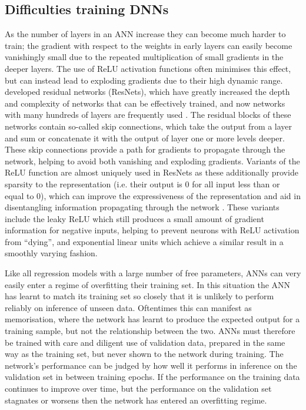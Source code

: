 \subsection{Difficulties training DNNs}

As the number of layers in an ANN increase they can become much harder to train; the gradient with respect to the weights in early layers can easily become vanishingly small due to the repeated multiplication of small gradients in the deeper layers.
The use of ReLU activation functions often minimises this effect, but can instead lead to exploding gradients due to their high dynamic range.
\citet{2015He} developed residual networks (ResNets), which have greatly increased the depth and complexity of networks that can be effectively trained, and now networks with many hundreds of layers are frequently used \citep[e.g.][]{Jegou2017}.
The residual blocks of these networks contain so-called skip connections, which take the output from a layer and sum or concatenate it with the output of layer one or more levels deeper.
These skip connections provide a path for gradients to propagate through the network, helping to avoid both vanishing and exploding gradients.
Variants of the ReLU function are almost uniquely used in ResNets as these additionally provide sparsity to the representation (i.e. their output is 0 for all input less than or equal to 0), which can improve the expressiveness of the representation and aid in disentangling information propagating through the network \citep{Glorot2011}.
These variants include the leaky ReLU \citep[$\max(0.01x, x)$;][]{Maas2013} which still produces a small amount of gradient information for negative inputs, helping to prevent neurons with ReLU activation from ``dying'', and exponential linear units \citep[ELUs;][]{Clevert2015} which achieve a similar result in a smoothly varying fashion.

Like all regression models with a large number of free parameters, ANNs can very easily enter a regime of overfitting their training set.
In this situation the ANN has learnt to match its training set so closely that it is unlikely to perform reliably on inference of unseen data.
Oftentimes this can manifest as memorisation, where the network has learnt to produce the expected output for a training sample, but not the relationship between the two.
ANNs must therefore be trained with care and diligent use of validation data, prepared in the same way as the training set, but never shown to the network during training.
The network's performance can be judged by how well it performs in inference on the validation set in between training epochs.
If the performance on the training data continues to improve over time, but the performance on the validation set stagnates or worsens then the network has entered an overfitting regime.

